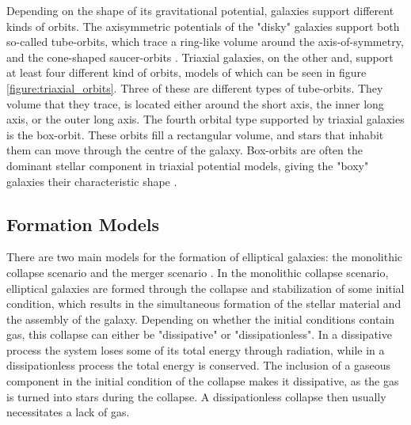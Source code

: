 \documentclass[english, twoside]{HYgradu}
\begin{document}
Depending on the shape of its gravitational potential, galaxies support different kinds of orbits. The axisymmetric potentials of the "disky" galaxies support both so-called tube-orbits, which trace a ring-like volume around the axis-of-symmetry, and the cone-shaped saucer-orbits \citep{MerrittBook}. Triaxial galaxies, on the other and, support at least four different kind of orbits, models of which can be seen in figure \ref{figure:triaxial_orbits}. Three of these are different types of tube-orbits. They volume that they trace, is located either around the short axis, the inner long axis, or the outer long axis. The fourth orbital type supported by triaxial galaxies is the box-orbit. These orbits fill a rectangular volume, and stars that inhabit them can move through the centre of the galaxy. Box-orbits are often the dominant stellar component in triaxial potential models, giving the "boxy" galaxies their characteristic shape \citep{BinneyTremaine}.


\subsection{Formation Models}

There are two main models for the formation of elliptical galaxies: the monolithic collapse scenario and the merger scenario \citep{GalaxyFormationAndEvo2010}. In the monolithic collapse scenario, elliptical galaxies are formed through the collapse and stabilization of some initial condition, which results in the simultaneous formation of the stellar material and the assembly of the galaxy. Depending on whether the initial conditions contain gas, this collapse can either be "dissipative" or "dissipationless". In a dissipative process the system loses some of its total energy through radiation, while in a dissipationless process the total energy is conserved. The inclusion of a gaseous component in the initial condition of the collapse makes it dissipative, as the gas is turned into stars during the collapse. A dissipationless collapse then usually necessitates a lack of gas.
\end{document}
